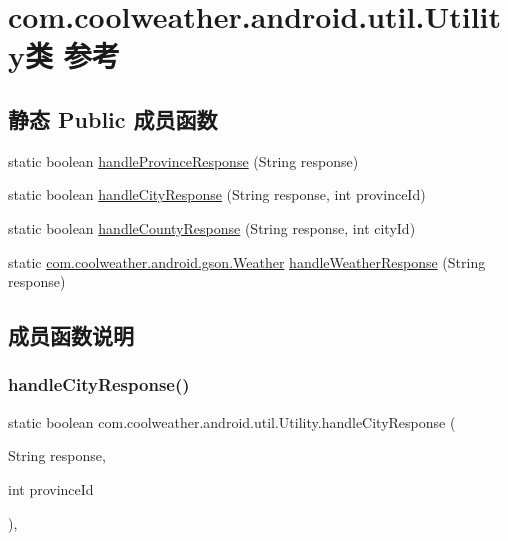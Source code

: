 \hypertarget{classcom_1_1coolweather_1_1android_1_1util_1_1_utility}{}\section{com.\+coolweather.\+android.\+util.\+Utility类 参考}
\label{classcom_1_1coolweather_1_1android_1_1util_1_1_utility}
\subsection*{静态 Public 成员函数}
\begin{DoxyCompactItemize}
\item 
static boolean \mbox{\hyperlink{classcom_1_1coolweather_1_1android_1_1util_1_1_utility_a2e6c5bca0144cb11d64944b6cad91513}{handle\+Province\+Response}} (String response)
\item 
static boolean \mbox{\hyperlink{classcom_1_1coolweather_1_1android_1_1util_1_1_utility_ab6706a766713dc3fceef0efa45c5bc40}{handle\+City\+Response}} (String response, int province\+Id)
\item 
static boolean \mbox{\hyperlink{classcom_1_1coolweather_1_1android_1_1util_1_1_utility_a6930663141e12ec51c79c2f86d5940ec}{handle\+County\+Response}} (String response, int city\+Id)
\item 
static \mbox{\hyperlink{classcom_1_1coolweather_1_1android_1_1gson_1_1_weather}{com.\+coolweather.\+android.\+gson.\+Weather}} \mbox{\hyperlink{classcom_1_1coolweather_1_1android_1_1util_1_1_utility_ae2790e64b7c8cf545c76dbe48ab1524c}{handle\+Weather\+Response}} (String response)
\end{DoxyCompactItemize}


\subsection{成员函数说明}
\mbox{\label{classcom_1_1coolweather_1_1android_1_1util_1_1_utility_ab6706a766713dc3fceef0efa45c5bc40}} 
\subsubsection{\texorpdfstring{handleCityResponse()}{handleCityResponse()}}
{\footnotesize\ttfamily static boolean com.\+coolweather.\+android.\+util.\+Utility.\+handle\+City\+Response (\begin{DoxyParamCaption}\item[{String}]{response,  }\item[{int}]{province\+Id }\end{DoxyParamCaption})\hspace{0.3cm}{\ttfamily [inline]}, {\ttfamily [static]}}

